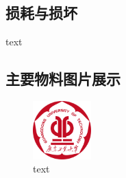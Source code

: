 \subsection{损耗与损坏}
text

\subsection{主要物料图片展示}
\begin{figure}[h]
    \centering
    \includegraphics[width=0.2\textwidth]{figures/logo.pdf}
    \caption{text}
\end{figure}
